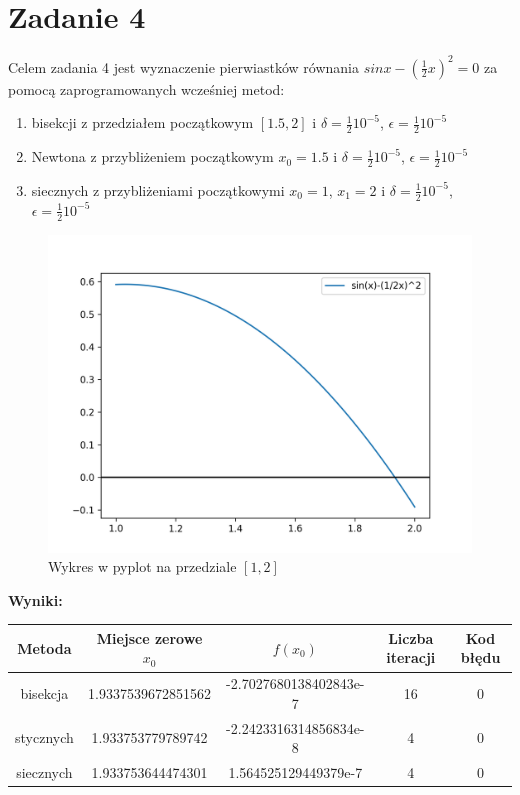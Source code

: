 \documentclass[12pt]{article}
\begin{document}
\section{Zadanie 4}
Celem zadania 4 jest wyznaczenie pierwiastków równania $sin x - (\frac{1}{2}x)^2 = 0$ za pomocą zaprogramowanych wcześniej metod:
\begin{enumerate}
	\item bisekcji z przedziałem początkowym $[1.5, 2]$ i $\delta=\frac{1}{2}10^{-5}$, $\epsilon=\frac{1}{2}10^{-5}$ 
	\item Newtona z przybliżeniem początkowym $x_0 = 1.5$ i $\delta=\frac{1}{2}10^{-5}$, $\epsilon=\frac{1}{2}10^{-5}$ 
	\item siecznych z przybliżeniami początkowymi $x_0=1$, $x_1=2$ i $\delta=\frac{1}{2}10^{-5}$, $\epsilon=\frac{1}{2}10^{-5}$ 
\end{enumerate}

\begin{figure}[!h]
	\centering
  \includegraphics[width=0.6\linewidth]{zad4_plot.png}
  \caption{Wykres w pyplot na przedziale $[1, 2]$}\label{fig:figure1}
\end{figure}

\textbf{Wyniki:}\\
\begin{table}[h!]
	\centering
    \label{tab:table1}
    \begin{tabular}{c|c|c|c|c}
    		Metoda & Miejsce zerowe $x_0$ & $f(x_0)$ & Liczba iteracji & Kod błędu \\
 		\hline
 		\hline
    		bisekcja & 1.9337539672851562 & -2.7027680138402843e-7 & 16 & 0\\
      	\hline
      	stycznych & 1.933753779789742 & -2.2423316314856834e-8 & 4 & 0\\
      	\hline
      	siecznych & 1.933753644474301 & 1.564525129449379e-7 & 4 & 0\\
		\hline
    \end{tabular}
\end{table}
\end{document}
